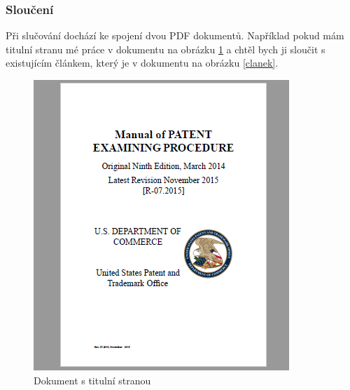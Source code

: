\documentclass[czech,BP]{thesiskiv}
\begin{document}
\subsubsection{Sloučení}
Při slučování dochází ke spojení dvou PDF dokumentů. Například pokud mám titulní stranu mé práce v dokumentu na obrázku \ref{titulni_strana} a chtěl bych ji sloučit s existujícím článkem, který je v dokumentu na obrázku \ref{clanek}.
\begin{figure}[h]
    \centering
    \begin{minipage}[b]{0.4\textwidth}
    	\includegraphics[width=\textwidth]{obr2.png}
    	\caption{Dokument s titulní stranou}
    	\label{titulni_strana}
    \end{minipage}
    \hfill
    \begin{minipage}[b]{0.4\textwidth}

\end{minipage}
\end{figure}
\end{document}
